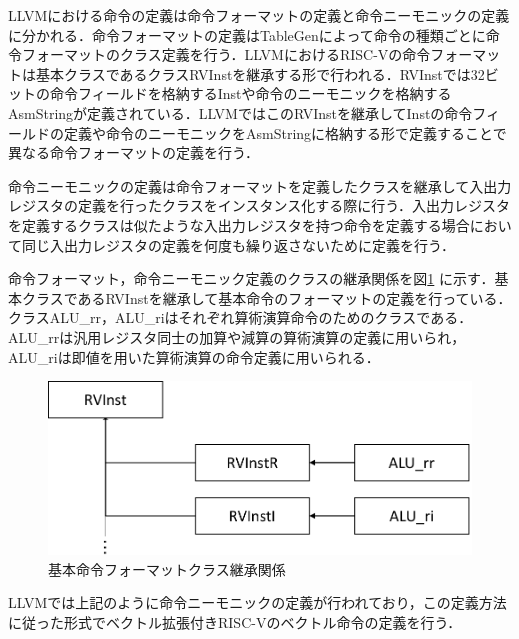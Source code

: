 LLVMにおける命令の定義は命令フォーマットの定義と命令ニーモニックの定義に分かれる．命令フォーマットの定義はTableGenによって命令の種類ごとに命令フォーマットのクラス定義を行う．LLVMにおけるRISC-Vの命令フォーマットは基本クラスであるクラスRVInstを継承する形で行われる．RVInstでは32ビットの命令フィールドを格納するInstや命令のニーモニックを格納するAsmStringが定義されている．LLVMではこのRVInstを継承してInstの命令フィールドの定義や命令のニーモニックをAsmStringに格納する形で定義することで異なる命令フォーマットの定義を行う．

命令ニーモニックの定義は命令フォーマットを定義したクラスを継承して入出力レジスタの定義を行ったクラスをインスタンス化する際に行う．入出力レジスタを定義するクラスは似たような入出力レジスタを持つ命令を定義する場合において同じ入出力レジスタの定義を何度も繰り返さないために定義を行う．

命令フォーマット，命令ニーモニック定義のクラスの継承関係を図\ref{fig:InstFromat_class}
に示す．基本クラスであるRVInstを継承して基本命令のフォーマットの定義を行っている．クラスALU\_rr，ALU\_riはそれぞれ算術演算命令のためのクラスである．ALU\_rrは汎用レジスタ同士の加算や減算の算術演算の定義に用いられ，ALU\_riは即値を用いた算術演算の命令定義に用いられる．

\begin{figure}[tb]
    \centering
    \includegraphics[scale=0.5]{image/InstFormat_class.pdf}
    \caption{基本命令フォーマットクラス継承関係}
    \label{fig:InstFromat_class}
\end{figure}

LLVMでは上記のように命令ニーモニックの定義が行われており，この定義方法に従った形式でベクトル拡張付きRISC-Vのベクトル命令の定義を行う．